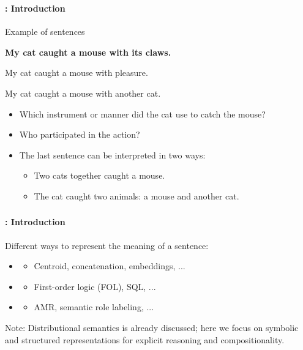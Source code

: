 \documentclass[xcolor=table]{beamer}
\subtitle[08- Sentence semantics]{Chapter 08\\Sentence semantics}
\begin{document}
	
\begin{frame}
	\frametitle{\inserttitle}
	\framesubtitle{\insertshortsubtitle: Introduction}

	\begin{exampleblock}{Example of sentences}
		\begin{center}
			\Large\bfseries
			My cat caught a mouse with its claws.
			
			My cat caught a mouse with pleasure.
			
			My cat caught a mouse with another cat.
		\end{center}
	\end{exampleblock}
	
	\begin{itemize}
		\item Which instrument or manner did the cat use to catch the mouse?
		\item Who participated in the action?
		\item The last sentence can be interpreted in two ways:
		\begin{itemize}
			\item Two cats together caught a mouse.
			\item The cat caught two animals: a mouse and another cat.
		\end{itemize}
	\end{itemize}

\end{frame}

\begin{frame}
	\frametitle{\inserttitle}
	\framesubtitle{\insertshortsubtitle: Introduction}
	
	Different ways to represent the meaning of a sentence:
	
	\begin{itemize}
		\item {}
		\begin{itemize}
			\item Centroid, concatenation, embeddings, ...
		\end{itemize}
		\item {}
		\begin{itemize}
			\item First-order logic (FOL), SQL, ...
		\end{itemize}
		\item {}
		\begin{itemize}
			\item AMR, semantic role labeling, ...
		\end{itemize}
	\end{itemize}
	
	\vspace{0.2cm}
	\footnotesize
	Note: Distributional semantics is already discussed; here we focus on symbolic and structured representations for explicit reasoning and compositionality.
\end{frame}
\end{document}
